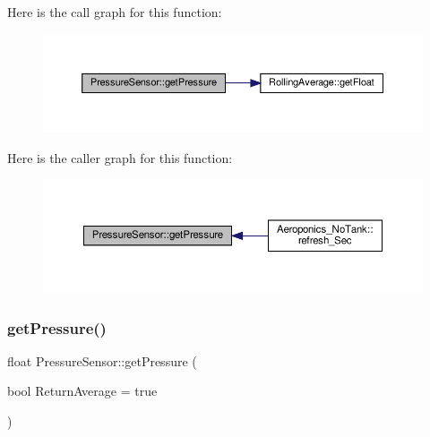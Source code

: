 Here is the call graph for this function\+:
\nopagebreak
\begin{figure}[H]
\begin{center}
\leavevmode
\includegraphics[width=350pt]{class_pressure_sensor_a39f2f08252640aeb9cf9c094ac796ed6_cgraph}
\end{center}
\end{figure}
Here is the caller graph for this function\+:
\nopagebreak
\begin{figure}[H]
\begin{center}
\leavevmode
\includegraphics[width=350pt]{class_pressure_sensor_a39f2f08252640aeb9cf9c094ac796ed6_icgraph}
\end{center}
\end{figure}
\mbox{\label{class_pressure_sensor_a39f2f08252640aeb9cf9c094ac796ed6}} 
\subsubsection{\texorpdfstring{get\+Pressure()}{getPressure()}\hspace{0.1cm}{\footnotesize\ttfamily [2/2]}}
{\footnotesize\ttfamily float Pressure\+Sensor\+::get\+Pressure (\begin{DoxyParamCaption}\item[{bool}]{Return\+Average = {\ttfamily true} }\end{DoxyParamCaption})}

\mbox{\label{class_pressure_sensor_aa3eccb7d69ba28ff2f5c4688bf13f7e8}} 
